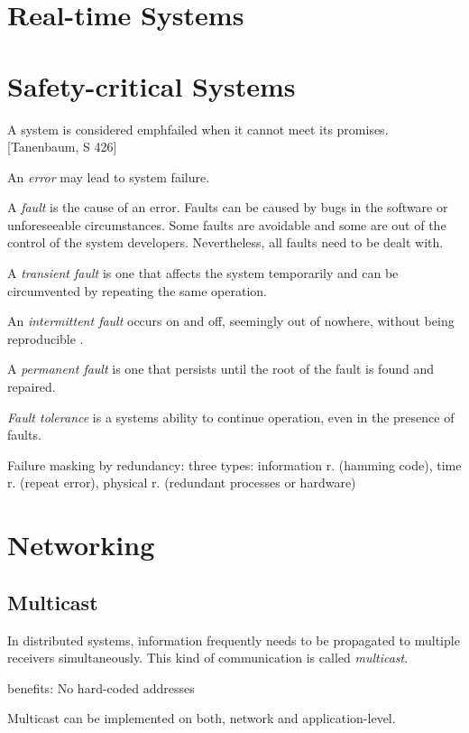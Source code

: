 \section{Real-time Systems}

\section{Safety-critical Systems}
A system is considered emph{failed} when it cannot meet its promises. [Tanenbaum, S 426]

An \emph{error} may lead to system failure.

A \emph{fault} is the cause of an error. Faults can be caused by bugs in the software or unforeseeable circumstances. Some faults are avoidable and some are out of the control of the system developers. Nevertheless, all faults need to be dealt with.

A \emph{transient fault} is one that affects the system temporarily and can be circumvented by repeating the same operation.

An \emph{intermittent fault} occurs on and off, seemingly out of nowhere, without being reproducible .

A \emph{permanent fault} is one that persists until the root of the fault is found and repaired.

\emph{Fault tolerance} is a systems ability to continue operation, even in the presence of faults.

Failure masking by redundancy: three types: information r. (hamming code), time r. (repeat error), physical r. (redundant processes or hardware)




\section{Networking}

\subsection{Multicast}

In distributed systems, information frequently needs to be propagated to multiple receivers simultaneously. This kind of communication is called \emph{multicast}.

benefits: No hard-coded addresses

Multicast can be implemented on both, network and application-level.

